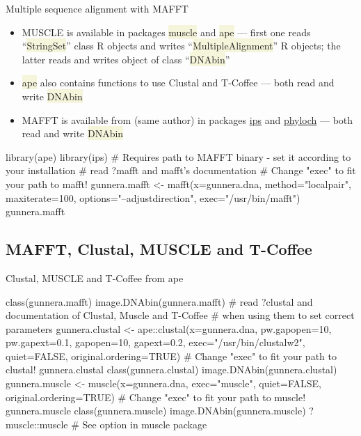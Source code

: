 \documentclass[compress, ucs, xelatex, 11pt, xcolor=svgnames, aspectratio=169,
	hyperref={
		bookmarks=true,
		unicode=true,
		colorlinks=true,
		pdftitle={Molecular data in R},
		plainpages=false,
		pdfauthor={Vojtech Zeisek},
		pdfsubject={Course about phylogeny and evolution in R},
		pdfcreator={XeLaTeX},
		pdfkeywords={R, evolution, phylogeny, molecular data},
		linkcolor=Crimson, %
		anchorcolor=Magenta, %
		citecolor=Magenta, %
		filecolor=Magenta, %
		menucolor=Magenta, %
		urlcolor=DodgerBlue, %
		pdftex},
	url={hyphens, lowtilde} %
	]{beamer}
\renewcommand{\texttt}[1]{\colorbox{Beige}{{\ttfamily #1}}}
\begin{document}
\begin{frame}[fragile]{Multiple sequence alignment with MAFFT}
	\begin{itemize}
		\item MUSCLE is available in packages \texttt{muscle} and \texttt{ape} --- first one reads \enquote{\texttt{*StringSet}} class R objects and writes \enquote{\texttt{*MultipleAlignment}} R objects; the latter reads and writes object of class \enquote{\texttt{DNAbin}}
		\item \texttt{ape} also contains functions to use Clustal and T-Coffee --- both read and write \texttt{DNAbin}
		\item MAFFT is available from (same author) in packages \href{https://CRAN.R-project.org/package=ips}{ips} and \href{http://www.christophheibl.de/Rpackages.html}{phyloch} --- both read and write \texttt{DNAbin}
	\end{itemize}
	\begin{spluscode}
    library(ape)
    library(ips)
    # Requires path to MAFFT binary - set it according to your installation
    # read ?mafft and mafft's documentation
    # Change "exec" to fit your path to mafft!
    gunnera.mafft <- mafft(x=gunnera.dna, method="localpair", maxiterate=100,
      options="--adjustdirection", exec="/usr/bin/mafft")
    gunnera.mafft
	\end{spluscode}
\end{frame}

\subsection{MAFFT, Clustal, MUSCLE and T-Coffee}

\begin{frame}[fragile]{Clustal, MUSCLE and T-Coffee from ape}
	\begin{spluscode}
    class(gunnera.mafft)
    image.DNAbin(gunnera.mafft)
    # read ?clustal and documentation of Clustal, Muscle and T-Coffee
    # when using them to set correct parameters
    gunnera.clustal <- ape::clustal(x=gunnera.dna, pw.gapopen=10, pw.gapext=0.1,
      gapopen=10, gapext=0.2, exec="/usr/bin/clustalw2", quiet=FALSE,
      original.ordering=TRUE) # Change "exec" to fit your path to clustal!
    gunnera.clustal
    class(gunnera.clustal)
    image.DNAbin(gunnera.clustal)
    gunnera.muscle <- muscle(x=gunnera.dna, exec="muscle", quiet=FALSE,
      original.ordering=TRUE) # Change "exec" to fit your path to muscle!
    gunnera.muscle
    class(gunnera.muscle)
    image.DNAbin(gunnera.muscle)
    ?muscle::muscle # See option in muscle package
	\end{spluscode}
\end{frame}
\end{document}
